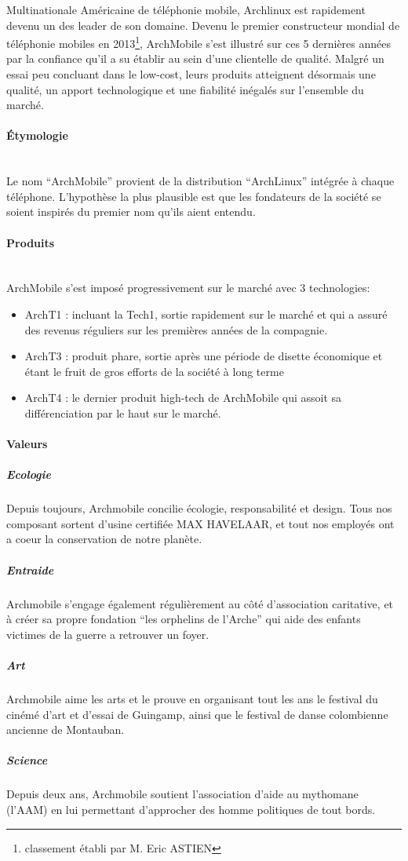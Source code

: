 Multinationale Américaine de téléphonie mobile, Archlinux 
est rapidement devenu un des leader de son domaine.
Devenu le premier constructeur mondial de téléphonie mobiles 
en 2013\footnote{classement établi par M. Eric ASTIEN},
ArchMobile s'est illustré sur ces 5 dernières années par
la confiance qu'il a su établir au sein d'une clientelle 
de qualité. Malgré un essai peu concluant dans le low-cost,
leurs produits atteignent désormais une qualité, un apport
technologique et une fiabilité inégalés sur l'ensemble du
marché.



\paragraph{\'Etymologie}~\\
Le nom ``ArchMobile'' provient de la distribution ``ArchLinux''
intégrée à  chaque téléphone. L'hypothèse la plus plausible
est que les fondateurs de la société se soient inspirés du premier
nom qu'ils aient entendu.

\paragraph{Produits}~\\
ArchMobile s'est imposé progressivement sur le marché avec 3 technologies:
\begin{itemize}
\item ArchT1 : incluant la Tech1, sortie rapidement sur le marché et qui a assuré 
  des revenus réguliers sur les premières années de la compagnie.
\item ArchT3 : produit phare, sortie après une période de disette 
  économique et étant le fruit de gros efforts de la société à long terme
\item ArchT4 : le dernier produit high-tech de ArchMobile qui assoit
  sa différenciation par le haut sur le marché.
\end{itemize}

\paragraph{Valeurs}
\subparagraph{Ecologie}
Depuis toujours, Archmobile concilie écologie, responsabilité et
design. Tous nos composant sortent d'usine certifiée MAX HAVELAAR, et
tout nos employés ont a coeur la conservation de notre planète.
\subparagraph{Entraide}
Archmobile s'engage également régulièrement au côté d'association
caritative, et à créer sa propre fondation ``les orphelins de
l'Arche'' qui aide des enfants victimes de la guerre a retrouver un
foyer.
\subparagraph{Art}
Archmobile aime les arts et le prouve en organisant tout les ans le
festival du cinémé d'art et d'essai de Guingamp, ainsi que le festival
de danse colombienne ancienne de Montauban.
\subparagraph{Science}
Depuis deux ans, Archmobile soutient l'association d'aide au mythomane
(l'AAM) en lui permettant d'approcher des homme politiques de tout
bords.
